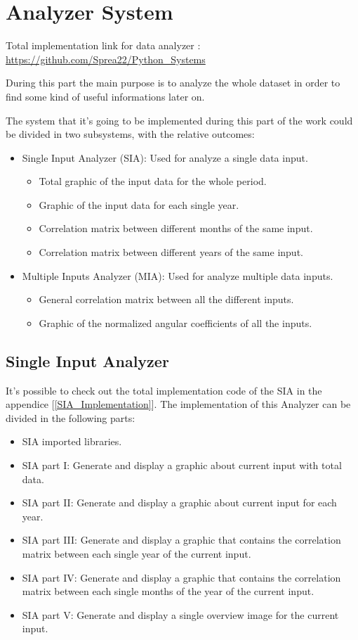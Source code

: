 
\chapter{Analyzer System}

Total implementation link for data analyzer : \\
\url{https://github.com/Sprea22/Python_Systems}

During this part the main purpose is to analyze the whole dataset in order to find some kind of useful informations later on. 

The system that it's going to be implemented during this part of the work could be divided in two subsystems, with the relative outcomes:
\begin{itemize}
\item Single Input Analyzer (SIA): Used for analyze a single data input.
\begin{itemize}
\item Total graphic of the input data for the whole period.
\item Graphic of the input data for each single year.
\item Correlation matrix between different months of the same input.
\item Correlation matrix between different years of the same input.
\end{itemize}
\item Multiple Inputs Analyzer (MIA): Used for analyze multiple data inputs.
\begin{itemize}
\item General correlation matrix between all the different inputs.

\item Graphic of the normalized angular coefficients of all the inputs.
\end{itemize}
\end{itemize}

\newpage


\section{Single Input Analyzer}
It's possible to check out the total implementation code of the SIA in the appendice  [\ref{SIA_Implementation}].
The implementation of this Analyzer can be divided in the following parts:
\begin{itemize}
\item SIA imported libraries. 
\item SIA part I: Generate and display a graphic about current input with total data.
\item SIA part II: Generate and display a graphic about current input for each year.
\item SIA part III: Generate and display a graphic that contains the correlation matrix between each single year of the current input.
\item SIA part IV: Generate and display a graphic that contains the correlation matrix between each single months of the year of the current input.
\item SIA part V: Generate and display a single overview image for the current input.
\end{itemize}

